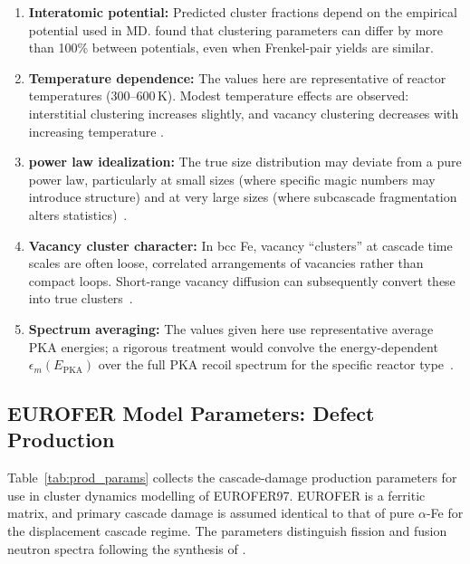 \documentclass[pdflatex,sn-basic]{sn-jnl} %
\begin{document}
\begin{enumerate}
  \item \textbf{Interatomic potential:} Predicted cluster fractions
    depend on the empirical potential used in MD.
    \cite{Terentyev2006PotentialEffectFe} found that clustering
    parameters can differ by more than 100\% between potentials,
    even when Frenkel-pair yields are similar.

  \item \textbf{Temperature dependence:} The values here are
    representative of reactor temperatures (300--600\,K).  Modest
    temperature effects are observed: interstitial clustering
 increases slightly, and vacancy clustering decreases with
    increasing temperature
    \cite{Stoller2000RoleCascadeEnergyTemperature}.

  \item \textbf{power law idealization:} The true size distribution
    may deviate from a pure power law, particularly at small sizes
    (where specific magic numbers may introduce structure) and at
    very large sizes (where subcascade fragmentation alters
    statistics)~\cite{DeBacker2018FragmentedCascades}.

  \item \textbf{Vacancy cluster character:} In bcc Fe, vacancy
    ``clusters'' at cascade time scales are often loose, correlated
    arrangements of vacancies rather than compact loops.  Short-range
    vacancy diffusion can subsequently convert these into true
    clusters~\cite{Stoller1998PointDefectClusterFormation,
    Soneda2001VacancyLoopCascadeCollapse}.

  \item \textbf{Spectrum averaging:} The values given here use
    representative average PKA energies; a rigorous treatment would
    convolve the energy-dependent $\epsilon_m(E_{\mathrm{PKA}})$
    over the full PKA recoil spectrum for the specific reactor
    type~\cite{Nordlund2018PrimaryDamageReview}.
\end{enumerate}
\label{sec:params_production}
\subsection{EUROFER Model Parameters: Defect Production}
\label{sec:params_production}
Table~\ref{tab:prod_params} collects the cascade-damage production parameters
for use in cluster dynamics modelling of EUROFER97. EUROFER is a ferritic
matrix, and primary cascade damage is assumed identical to that of pure
$\alpha$-Fe for the displacement cascade regime. The parameters distinguish
fission and fusion neutron spectra following the synthesis of
\cite{Stoller2000,Nordlund2018,DeBacker2018,Malerba2021}.
\end{document}
